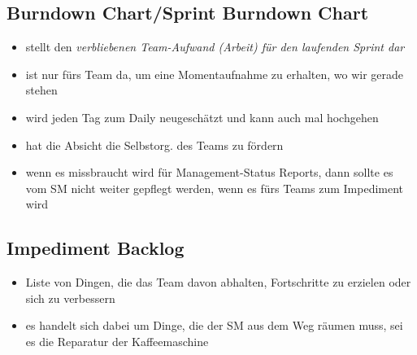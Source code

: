 \subsection{Burndown Chart/Sprint Burndown Chart}
\begin{itemize}
  \item stellt den \textit{verbliebenen Team-Aufwand (Arbeit) für den laufenden Sprint dar}
  \item ist nur fürs Team da, um eine Momentaufnahme zu erhalten, wo wir gerade stehen
  \item wird jeden Tag zum Daily neugeschätzt und kann auch mal hochgehen
  \item hat die Absicht die Selbstorg. des Teams zu fördern
  \item wenn es missbraucht wird für Management-Status Reports, dann sollte es vom SM
    nicht weiter gepflegt werden, wenn es fürs Teams zum Impediment wird
\end{itemize}


\subsection{Impediment Backlog}
\begin{itemize}
  \item Liste von Dingen, die das Team davon abhalten, Fortschritte zu erzielen oder sich zu
    verbessern
  \item es handelt sich dabei um Dinge, die der SM aus dem Weg räumen muss, sei es die
    Reparatur der Kaffeemaschine
\end{itemize}


